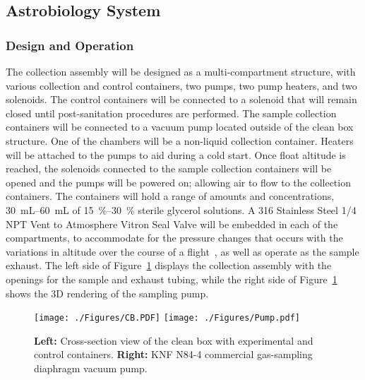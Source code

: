 \subsection{Astrobiology System}
\label{sec:Astrobiology System}

\subsubsection{Design and Operation}
The collection assembly will be designed as a multi-compartment structure, with various collection and control containers, two pumps, two pump heaters, and two solenoids.  The control containers will be connected to a solenoid that will remain closed until post-sanitation procedures are performed. The sample collection containers will be connected to a vacuum pump located outside of the clean box structure.  One of the chambers will be a non-liquid collection container. Heaters will be attached to the pumps to aid during a cold start. Once float altitude is reached, the solenoids connected to the sample collection containers will be opened and the pumps will be powered on; allowing air to flow to the collection containers. The containers will hold a range of amounts and concentrations, \SIrange{30}{60}{\milli\liter} of \SIrange{15}{30}{\%} sterile glycerol solutions. A 316 Stainless Steel \SI{1/4}{\inch} NPT Vent to Atmosphere Vitron Seal Valve will be embedded in each of the compartments, to accommodate for the pressure changes that occurs with the variations in altitude over the course of a flight~\cite{valve}, as well as operate as the sample exhaust.  The left side of Figure~\ref{fig:pump} displays the collection assembly with the openings for the sample and exhaust tubing, while the right side of Figure~\ref{fig:pump} shows the 3D rendering of the sampling pump.  

\begin{figure}[!h] 
\begin{center}
\texttt{[image: ./Figures/CB.PDF]}
\texttt{[image: ./Figures/Pump.pdf]}
\caption{{\bf Left:} Cross-section view of the clean box with experimental and control containers. {\bf Right:} KNF N84-4 commercial gas-sampling diaphragm vacuum pump. }
\label{fig:pump}
\end{center}
\end{figure} 
